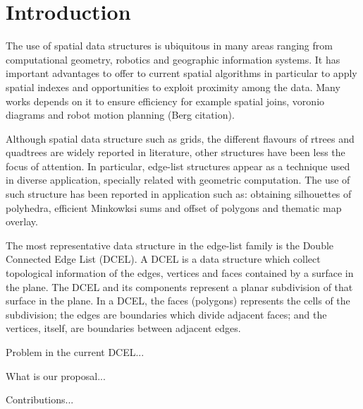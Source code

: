 \section{Introduction}
The use of spatial data structures is ubiquitous in many areas ranging from computational geometry, robotics and geographic information systems.  It has important advantages to offer to current spatial algorithms in particular to apply spatial indexes and opportunities to exploit proximity among the data.  Many works depends on it to ensure efficiency for example spatial joins, voronio diagrams and robot motion planning (Berg citation).

Although spatial data structure such as grids, the different flavours of rtrees and quadtrees are widely reported in literature, other structures have been less the focus of attention.  In particular, edge-list structures appear as a technique used in diverse application, specially related with geometric computation.  The use of such structure has been reported in application such as: obtaining silhouettes of polyhedra, efficient Minkowksi sums and offset of polygons and thematic map overlay. 

The most representative data structure in the edge-list family is the Double Connected Edge List (DCEL).  A DCEL is a data structure which collect topological information of the edges, vertices and faces contained by a surface in the plane.  The DCEL and its components represent a planar subdivision of that surface in the plane. In a DCEL, the faces (polygons) represents the cells of the subdivision; the edges are boundaries which divide adjacent faces; and the vertices, itself, are boundaries between adjacent edges.

Problem in the current DCEL...

What is our proposal...

Contributions...
